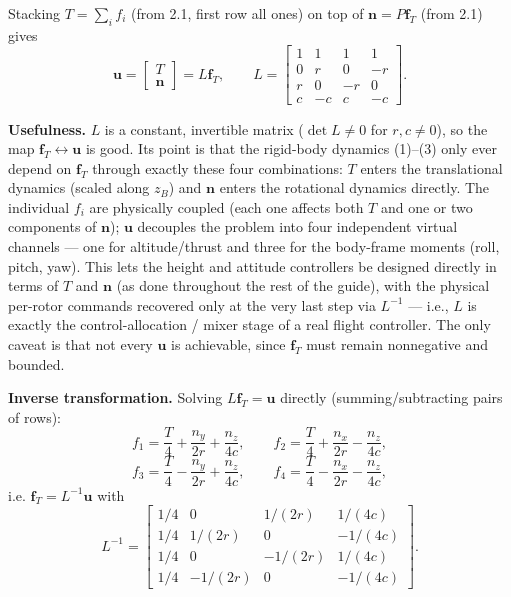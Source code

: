 \documentclass[11pt]{article}
\begin{document}
Stacking $T = \sum_i f_i$ (from 2.1, first row all ones) on top of $\mathbf{n} = P\mathbf{f}_T$ (from 2.1) gives
\[
\mathbf{u} = \begin{bmatrix} T \\ \mathbf{n} \end{bmatrix} = L\mathbf{f}_T, \qquad L = \begin{bmatrix} 1 & 1 & 1 & 1 \\ 0 & r & 0 & -r \\ r & 0 & -r & 0 \\ c & -c & c & -c \end{bmatrix}.
\]

\noindent\textbf{Usefulness.} $L$ is a constant, invertible matrix ($\det L \neq 0$ for $r, c \neq 0$), so the map $\mathbf{f}_T \leftrightarrow \mathbf{u}$ is good. Its point is that the rigid-body dynamics (1)--(3) only ever depend on $\mathbf{f}_T$ through exactly these four combinations: $T$ enters the translational dynamics (scaled along $z_B$) and $\mathbf{n}$ enters the rotational dynamics directly. The individual $f_i$ are physically coupled (each one affects both $T$ and one or two components of $\mathbf{n}$); $\mathbf{u}$ decouples the problem into four independent virtual channels --- one for altitude/thrust and three for the body-frame moments (roll, pitch, yaw). This lets the height and attitude controllers be designed directly in terms of $T$ and $\mathbf{n}$ (as done throughout the rest of the guide), with the physical per-rotor commands recovered only at the very last step via $L^{-1}$ --- i.e., $L$ is exactly the control-allocation / mixer stage of a real flight controller. The only caveat is that not every $\mathbf{u}$ is achievable, since $\mathbf{f}_T$ must remain nonnegative and bounded.

\noindent\textbf{Inverse transformation.} Solving $L\mathbf{f}_T = \mathbf{u}$ directly (summing/subtracting pairs of rows):
\[
f_1 = \frac{T}{4} + \frac{n_y}{2r} + \frac{n_z}{4c}, \qquad f_2 = \frac{T}{4} + \frac{n_x}{2r} - \frac{n_z}{4c},
\]
\[
f_3 = \frac{T}{4} - \frac{n_y}{2r} + \frac{n_z}{4c}, \qquad f_4 = \frac{T}{4} - \frac{n_x}{2r} - \frac{n_z}{4c},
\]
i.e. $\mathbf{f}_T = L^{-1}\mathbf{u}$ with
\[
L^{-1} = \begin{bmatrix} 1/4 & 0 & 1/(2r) & 1/(4c) \\ 1/4 & 1/(2r) & 0 & -1/(4c) \\ 1/4 & 0 & -1/(2r) & 1/(4c) \\ 1/4 & -1/(2r) & 0 & -1/(4c) \end{bmatrix}.
\]
\end{document}
